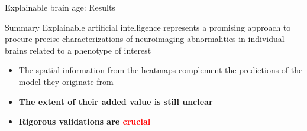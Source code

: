 \begin{frame}{Explainable brain age: Results}
\end{frame}

\begin{frame}{Summary}
    Explainable artificial intelligence represents a promising approach to procure precise characterizations of neuroimaging abnormalities in individual brains related to a phenotype of interest
    \begin{itemize}
        \item The spatial information from the heatmaps complement the predictions of the model they originate from
        \item \textbf{The extent of their added value is still unclear}
        \item \textbf{Rigorous validations are \textcolor{red}{crucial}}
    \end{itemize}
\end{frame}
